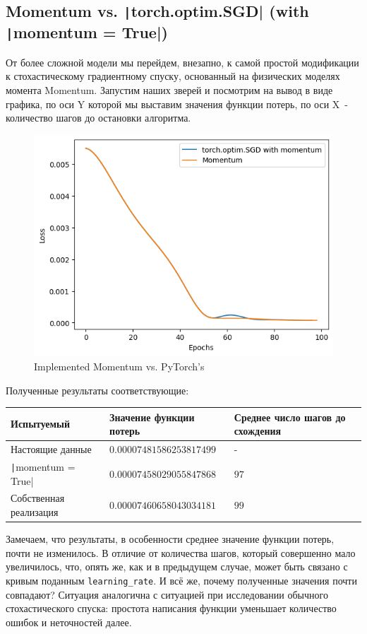 \documentclass[12pt, a4paper, oneside, final]{article}
\begin{document}
	\subsection*{Momentum vs. \texttt|torch.optim.SGD| (with \texttt|momentum = True|)}
	От более сложной модели мы перейдем, внезапно, к самой простой модификации к стохастическому градиентному спуску, основанный на физических моделях момента Momentum.
	Запустим наших зверей и посмотрим на вывод в виде графика, по оси Y которой мы выставим значения функции потерь, по оси X~- количество шагов до остановки алгоритма.
	\begin{figure}[H]
		\centering
		\includegraphics[scale = 1]{Image/T1_MOMENTUM_vs_torch_optim_SGD_MOMENTUM.png}
		\caption*{Implemented Momentum vs. PyTorch's}
	\end{figure}
	Полученные результаты соответствующие:
	\begin{table}[H]
		\centering
		\begin{tabular}{l|l|l}
			Испытуемый & Значение функции потерь & Среднее число шагов до схождения \\ \hline
			Настоящие данные & $0.00007481586253817499$ & - \\
			\texttt|momentum = True| & $0.00007458029055847868$ & $97$ \\
			Собственная реализация & $0.00007460658043034181$ & $99$
		\end{tabular}
	\end{table}
	Замечаем, что результаты, в особенности среднее значение функции потерь, почти не изменилось.
	В отличие от количества шагов, который совершенно мало увеличилось, что, опять же, как и в предыдущем случае, может быть связано с кривым поданным \texttt{learning\_rate}.
	И всё же, почему полученные значения почти совпадают?
	Ситуация аналогична с ситуацией при исследовании обычного стохастического спуска: простота написания функции уменьшает количество ошибок и неточностей далее.
\end{document}
